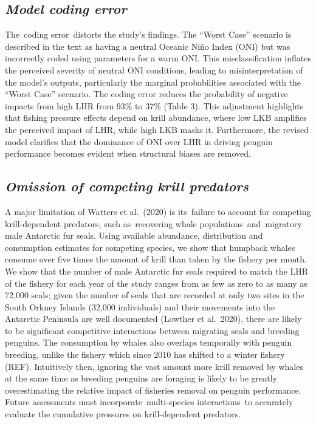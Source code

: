\documentclass[]{elsarticle} %
\begin{document}
\subsection{\texorpdfstring{\emph{Model coding
error}}{Model coding error}}\label{model-coding-error-2}

The~coding error~distorts the study's findings. The ``Worst Case''
scenario is described in the text as having a neutral Oceanic Niño Index
(ONI) but was incorrectly coded using parameters for a warm ONI. This
misclassification inflates the perceived severity of neutral ONI
conditions, leading to misinterpretation of the model's outputs,
particularly the marginal probabilities associated with the ``Worst
Case'' scenario. The coding error reduces the probability of negative
impacts from high LHR from 93\% to 37\% (Table 3). This adjustment
highlights that fishing pressure effects depend on krill abundance,
where low LKB amplifies the perceived impact of LHR, while high LKB
masks it. Furthermore, the revised model clarifies that the dominance of
ONI over LHR in driving penguin performance becomes evident when
structural biases are removed.

\subsection{\texorpdfstring{\emph{Omission of competing krill
predators}}{Omission of competing krill predators}}\label{omission-of-competing-krill-predators}

A major limitation of Watters et al.~(2020) is its~failure to account
for competing krill-dependent predators, such as~recovering whale
populations~and~migratory male Antarctic fur seals. Using available
abundance, distribution and consumption estimates for competing species,
we show that humpback whales consume over five times the amount of krill
than taken by the fishery per month. We show that the number of male
Antarctic fur seals required to match the LHR of the fishery for each
year of the study ranges from as few as zero to as many as 72,000 seals;
given the number of seals that are recorded at only two sites in the
South Orkney Islands (32,000 individuals) and their movements into the
Antarctic Peninsula are well documented (Lowther et al.~2020), there are
likely to be significant competitive interactions between migrating
seals and breeding penguins. The consumption by whales also overlaps
temporally with penguin breeding, unlike the fishery which since 2010
has shifted to a winter fishery (REF). Intuitively then, ignoring the
vast amount more krill removed by whales at the same time as breeding
penguins are foraging is likely to be greatly overestimating the
relative impact of fisheries removal on penguin performance. Future
assessments must incorporate~multi-species interactions~to accurately
evaluate the cumulative pressures on krill-dependent predators.
\end{document}
